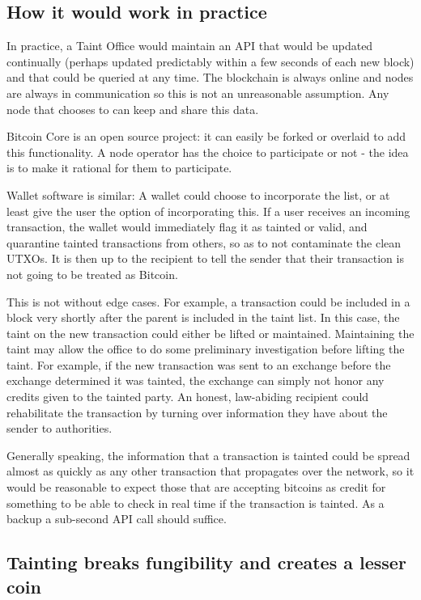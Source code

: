 \documentclass{article}%
\begin{document}
\subsection{How it would work in practice}

In practice, a Taint Office would maintain an API that would be updated
continually (perhaps updated predictably within a few seconds of each new
block) and that could be queried at any time. The blockchain is always online
and nodes are always in communication so this is not an unreasonable
assumption.  Any node that chooses to can keep and share this data.

Bitcoin Core is an open source project: it can easily be forked or overlaid to
add this functionality.  A node operator has the choice to
participate or not - the idea is to make it rational for them to participate.

Wallet software is similar: A wallet could choose to incorporate the list, or
at least give the user the option of incorporating this.  If a user receives
an incoming transaction, the wallet would immediately flag it as tainted or valid, and
quarantine tainted transactions from others, so as to not contaminate the clean UTXOs.  It is then
up to the recipient to tell the sender that their transaction is not going to
be treated as Bitcoin.

This is not without edge cases. For example, a transaction could be included in a block very
shortly after the parent is included in the taint list.  In this case, the
taint on the new transaction could either be lifted or maintained.
 Maintaining the taint may allow the office to do some preliminary
investigation before lifting the taint. For example, if the new transaction
was sent to an exchange before the exchange determined it was tainted, the
exchange can simply not honor any credits given to the tainted party. An
honest, law-abiding recipient could rehabilitate the transaction by turning over
information they have about the sender to authorities.

Generally speaking, the information that a transaction is tainted could be
spread almost as quickly as any other transaction that propagates over the
network, so it would be reasonable to expect those that are accepting bitcoins
as credit for something to be able to check in real time if the transaction is
tainted.  As a backup a sub-second API call should suffice.

\subsection{Tainting breaks fungibility and creates a lesser coin}
\end{document}
